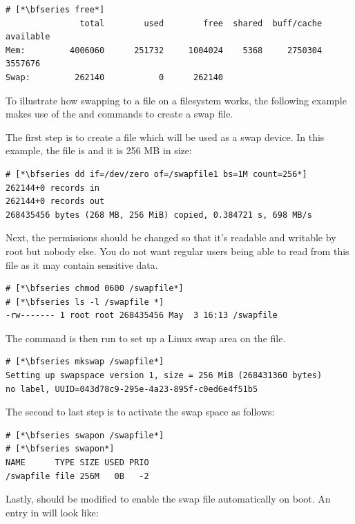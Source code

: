 \begin{lstlisting}
# [*\bfseries free*]
               total        used        free  shared  buff/cache   available
Mem:         4006060      251732     1004024    5368     2750304     3557676
Swap:         262140           0      262140
\end{lstlisting}

\noindent
To illustrate how swapping to a file on a filesystem works,  the following example makes use of the  and  commands to create a swap file.

The first step is to create a file which will be used as a swap device. In this example, the file is  and it is 256 MB in size:

\begin{lstlisting}
# [*\bfseries dd if=/dev/zero of=/swapfile1 bs=1M count=256*]
262144+0 records in
262144+0 records out
268435456 bytes (268 MB, 256 MiB) copied, 0.384721 s, 698 MB/s
\end{lstlisting}

\noindent
Next, the permissions should be changed so that it's readable and writable by root but nobody else. You do not want regular users being able to read from this file as it may contain sensitive data.

\begin{lstlisting}
# [*\bfseries chmod 0600 /swapfile*]
# [*\bfseries ls -l /swapfile *]
-rw------- 1 root root 268435456 May  3 16:13 /swapfile
\end{lstlisting}

\noindent
The  command is then run to set up a Linux swap area on the file.

\begin{lstlisting}
# [*\bfseries mkswap /swapfile*]
Setting up swapspace version 1, size = 256 MiB (268431360 bytes)
no label, UUID=043d78c9-295e-4a23-895f-c0ed6e4f51b5
\end{lstlisting}

\noindent
The second to last step is to activate the swap space as follows:

\begin{lstlisting}
# [*\bfseries swapon /swapfile*]
# [*\bfseries swapon*]
NAME      TYPE SIZE USED PRIO
/swapfile file 256M   0B   -2
\end{lstlisting}

\noindent
Lastly,  should be modified to enable the swap file automatically on boot. An entry in  will look like:

